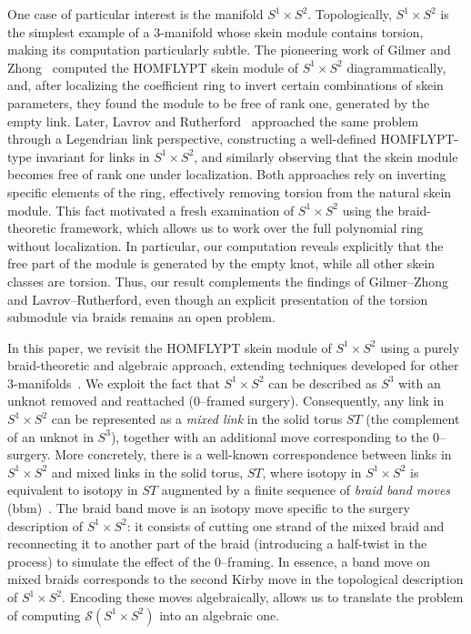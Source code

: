 \documentclass[11pt]{amsart}
\begin{document}
One case of particular interest is the manifold $S^1 \times S^2$. Topologically, $S^1 \times S^2$ is the simplest example of a $3$-manifold whose skein module contains torsion, making its computation particularly subtle. The pioneering work of Gilmer and Zhong~\cite{GZ1} computed the HOMFLYPT skein module of $S^1 \times S^2$ diagrammatically, and, after localizing the coefficient ring to invert certain combinations of skein parameters, they found the module to be free of rank one, generated by the empty link. Later, Lavrov and Rutherford~\cite{LR3} approached the same problem through a Legendrian link perspective, constructing a well-defined HOMFLYPT-type invariant for links in $S^1 \times S^2$, and similarly observing that the skein module becomes free of rank one under localization. Both approaches rely on inverting specific elements of the ring, effectively removing torsion from the natural skein module. This fact motivated a fresh examination of $S^1 \times S^2$ using the braid-theoretic framework, which allows us to work over the full polynomial ring without localization. In particular, our computation reveals explicitly that the free part of the module is generated by the empty knot, while all other skein classes are torsion. Thus, our result complements the findings of Gilmer–Zhong and Lavrov–Rutherford, even though an explicit presentation of the torsion submodule via braids remains an open problem.


In this paper, we revisit the HOMFLYPT skein module of $S^1 \times S^2$ using a purely braid-theoretic and algebraic approach, extending techniques developed for other $3$-manifolds~\cite{DL3, DAMS}. We exploit the fact that $S^1 \times S^2$ can be described as $S^3$ with an unknot removed and reattached ($0$--framed surgery). Consequently, any link in $S^1 \times S^2$ can be represented as a \emph{mixed link} in the solid torus $ST$ (the complement of an unknot in $S^3$), together with an additional move corresponding to the $0$--surgery. More concretely, there is a well-known correspondence between links in $S^1 \times S^2$ and mixed links in the solid torus, $ST$, where isotopy in $S^1 \times S^2$ is equivalent to isotopy in $ST$ augmented by a finite sequence of {\it braid band moves} (bbm)~\cite{LR1,LR2,DL1}. The braid band move is an isotopy move specific to the surgery description of $S^1 \times S^2$: it consists of cutting one strand of the mixed braid and reconnecting it to another part of the braid (introducing a half-twist in the process) to simulate the effect of the $0$--framing. In essence, a band move on mixed braids corresponds to the second Kirby move in the topological description of $S^1 \times S^2$. Encoding these moves algebraically, allows us to translate the problem of computing $\mathcal{S}(S^1 \times S^2)$ into an algebraic one.
\end{document}
